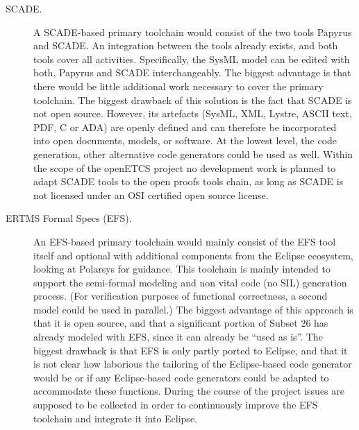 \begin{description}

\item[SCADE.] A SCADE-based primary toolchain would consist of the two tools Papyrus and SCADE.  An integration between the tools already exists, and both tools cover all activities.  Specifically, the SysML model can be edited with both, Papyrus and SCADE interchangeably.  The biggest advantage is that there would be little additional work necessary to cover the primary toolchain.  The biggest drawback of this solution is the fact that SCADE is not open source.  However, its artefacts (SysML, XML, Lystre, ASCII text, PDF, C or ADA) are openly defined and can therefore be incorporated into open documents, models, or software.
At the lowest level, the code generation, other alternative code generators could be used as well. Within the scope of the openETCS project no development work is planned to adapt SCADE tools to the open proofs tools chain, as long as SCADE is not licensed under an OSI certified open source license.

\item[ERTMS Formal Specs (EFS).] An EFS-based primary toolchain would mainly consist of the EFS tool itself and optional with additional components from the Eclipse ecosystem, looking at Polarsys for guidance. This toolchain is mainly intended to support the semi-formal modeling and non vital code (no SIL) generation process. (For verification purposes of functional correctness, a second model could be used in parallel.)
The biggest advantage of this approach is that it is open source, and that a significant portion of Subset 26 has already modeled with EFS, since it can already be ``used as is''. The biggest drawback is that EFS is only partly ported to Eclipse, and that it is not clear how laborious the tailoring of the Eclipse-based code generator would be or if any Eclipse-based code generators could be adapted to accommodate these functions. During the course of the project issues are supposed to be collected in order to continuously improve the EFS toolchain and integrate it into Eclipse.



\end{description}
